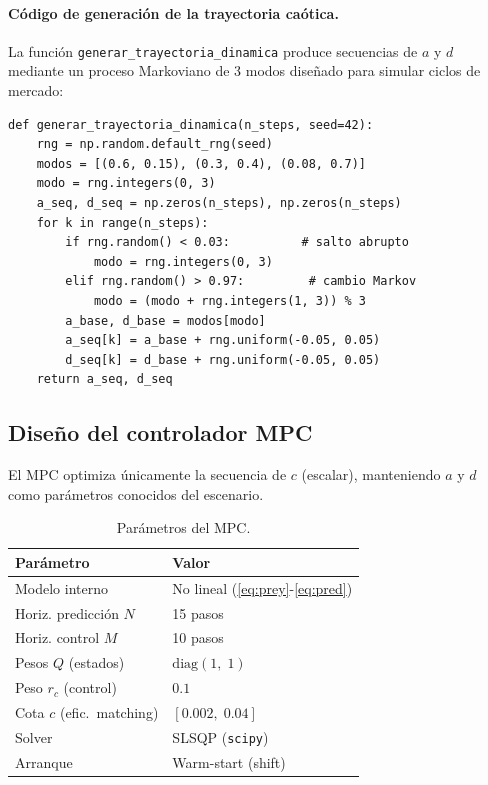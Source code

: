 \documentclass[twocolumn,10pt]{article}
\begin{document}
\paragraph{C\'odigo de generaci\'on de la trayectoria ca\'otica.}
La funci\'on \texttt{generar\_trayectoria\_dinamica} produce
secuencias de $a$ y $d$ mediante un proceso Markoviano de 3
modos dise\~nado para simular ciclos de mercado:
\begin{lstlisting}
def generar_trayectoria_dinamica(n_steps, seed=42):
    rng = np.random.default_rng(seed)
    modos = [(0.6, 0.15), (0.3, 0.4), (0.08, 0.7)]
    modo = rng.integers(0, 3)
    a_seq, d_seq = np.zeros(n_steps), np.zeros(n_steps)
    for k in range(n_steps):
        if rng.random() < 0.03:          # salto abrupto
            modo = rng.integers(0, 3)
        elif rng.random() > 0.97:         # cambio Markov
            modo = (modo + rng.integers(1, 3)) % 3
        a_base, d_base = modos[modo]
        a_seq[k] = a_base + rng.uniform(-0.05, 0.05)
        d_seq[k] = d_base + rng.uniform(-0.05, 0.05)
    return a_seq, d_seq
\end{lstlisting}

\subsection*{Dise\~no del controlador MPC}

El MPC optimiza \'unicamente la secuencia de $c$ (escalar),
manteniendo $a$ y $d$ como par\'ametros conocidos del escenario.

\begin{table}[t]
\centering\footnotesize
\caption{Par\'ametros del MPC.}
\label{tab:mpc}
\begin{tabular}{@{}ll@{}}
\toprule
\textbf{Par\'ametro} & \textbf{Valor} \\
\midrule
Modelo interno & No lineal (\ref{eq:prey}-\ref{eq:pred}) \\
Horiz. predicci\'on $N$ & 15 pasos \\
Horiz. control $M$ & 10 pasos \\
Pesos $Q$ (estados) & $\text{diag}(1,\;1)$ \\
Peso $r_c$ (control) & $0.1$ \\
Cota $c$ (efic.\ matching) & $[0.002,\;0.04]$ \\
Solver & SLSQP (\texttt{scipy}) \\
Arranque & Warm-start (shift) \\
\bottomrule
\end{tabular}
\end{table}
\end{document}
